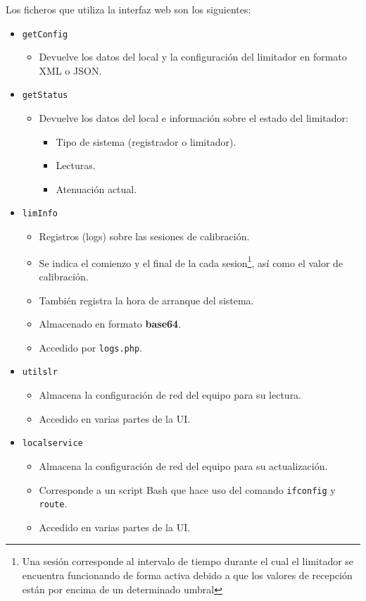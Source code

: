 Los ficheros que utiliza la interfaz web son los siguientes:
\begin{itemize}
    \item \verb|getConfig|
    \begin{itemize}
        \item Devuelve los datos del local y la configuración del limitador en formato \acrshort{XML} o \acrshort{JSON}.
    \end{itemize}

    \item \verb|getStatus|
    \begin{itemize}
        \item Devuelve los datos del local e información sobre el estado del limitador:
        \begin{itemize}
            \item Tipo de sistema (registrador o limitador).
            \item Lecturas.
            \item Atenuación actual.
        \end{itemize}
    \end{itemize}

    \item \verb|limInfo|
    \begin{itemize}
        \item Registros (logs) sobre las sesiones de calibración.
        \item Se indica el comienzo y el final de la cada \gls{sesion}\footnote{Una sesión corresponde al intervalo de tiempo durante el cual el limitador se encuentra funcionando de forma activa debido a que los valores de recepción están por encima de un determinado umbral}, así como el valor de calibración.
        \item También registra la hora de arranque del sistema.
        \item Almacenado en formato \textbf{base64}.
        \item Accedido por \verb|logs.php|.
    \end{itemize}

    \item \verb|utilslr|
    \begin{itemize}
        \item Almacena la configuración de red del equipo para su lectura.
        \item Accedido en varias partes de la UI.
    \end{itemize}

    \item \verb|localservice|
    \begin{itemize}
        \item Almacena la configuración de red del equipo para su actualización.
        \item Corresponde a un script Bash que hace uso del comando \verb|ifconfig| y \verb|route|.
        \item Accedido en varias partes de la UI.
    \end{itemize}
\end{itemize}

